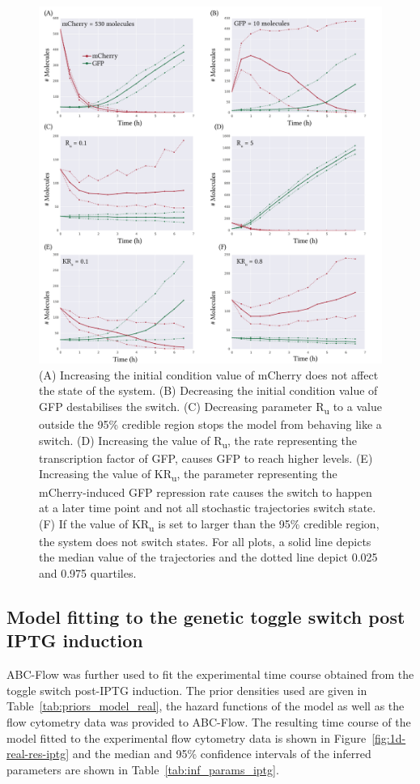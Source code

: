 \begin{figure}[htb]
\centerfloat
	\includegraphics[width=\textwidth]{../../chapters/chapterABCFlow/images/promoter_strengths.png}
	\caption[Changing the parameter values affects the behaviour of the switch ]{\label{fig:prom_str} (A) Increasing the initial condition value of mCherry does not affect the state of the system. (B) Decreasing the initial condition value of GFP destabilises the switch. (C) Decreasing parameter R\textsubscript{u} to a value outside the 95\% credible region stops the model from behaving like a switch. (D) Increasing the value of R\textsubscript{u}, the rate representing the transcription factor of GFP, causes GFP to reach higher levels. (E) Increasing  the value of KR\textsubscript{u}, the parameter representing the mCherry-induced GFP repression rate causes the switch to happen at a later time point and not all stochastic trajectories switch state. (F) If the value of KR\textsubscript{u} is set to larger than the 95\% credible region, the system does not switch states. For all plots, a solid line depicts the median value of the trajectories and the dotted line depict 0.025 and 0.975 quartiles.}
\end{figure}



\clearpage
\subsection{Model fitting to the genetic toggle switch post IPTG induction}
ABC-Flow was further used to fit the experimental time course obtained from the toggle switch post-IPTG induction. The prior densities used are given in Table~\ref{tab:priors_model_real}, the hazard functions of the model as well as the flow cytometry data was provided to ABC-Flow. The resulting time course of the model fitted to the experimental flow cytometry data is shown in Figure~\ref{fig:1d-real-res-iptg} and the median and 95\% confidence intervals of the inferred parameters are shown in Table~\ref{tab:inf_params_iptg}.


